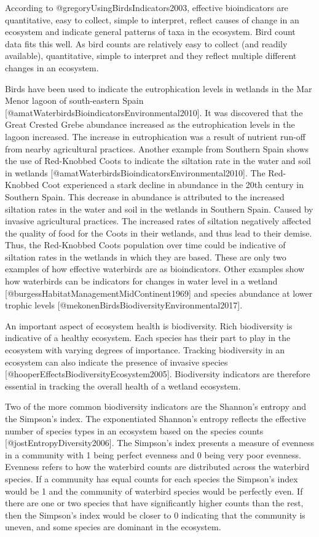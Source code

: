 \documentclass[
]{article}
\begin{document}
According to @gregoryUsingBirdsIndicators2003, effective bioindicators
are quantitative, easy to collect, simple to interpret, reflect causes
of change in an ecosystem and indicate general patterns of taxa in the
ecosystem. Bird count data fits this well. As bird counts are relatively
easy to collect (and readily available), quantitative, simple to
interpret and they reflect multiple different changes in an ecosystem.

Birds have been used to indicate the eutrophication levels in wetlands
in the Mar Menor lagoon of south-eastern Spain
{[}@amatWaterbirdsBioindicatorsEnvironmental2010{]}. It was discovered
that the Great Crested Grebe abundance increased as the eutrophication
levels in the lagoon increased. The increase in eutrophication was a
result of nutrient run-off from nearby agricultural practices. Another
example from Southern Spain shows the use of Red-Knobbed Coots to
indicate the siltation rate in the water and soil in wetlands
{[}@amatWaterbirdsBioindicatorsEnvironmental2010{]}. The Red-Knobbed
Coot experienced a stark decline in abundance in the 20th century in
Southern Spain. This decrease in abundance is attributed to the
increased siltation rates in the water and soil in the wetlands in
Southern Spain. Caused by invasive agricultural practices. The increased
rates of siltation negatively affected the quality of food for the Coots
in their wetlands, and thus lead to their demise. Thus, the Red-Knobbed
Coots population over time could be indicative of siltation rates in the
wetlands in which they are based. These are only two examples of how
effective waterbirds are as bioindicators. Other examples show how
waterbirds can be indicators for changes in water level in a wetland
{[}@burgessHabitatManagementMidContinent1969{]} and species abundance at
lower trophic levels {[}@mekonenBirdsBiodiversityEnvironmental2017{]}.

An important aspect of ecosystem health is biodiversity. Rich
biodiversity is indicative of a healthy ecosystem. Each species has
their part to play in the ecosystem with varying degrees of importance.
Tracking biodiversity in an ecosystem can also indicate the presence of
invasive species {[}@hooperEffectsBiodiversityEcosystem2005{]}.
Biodiversity indicators are therefore essential in tracking the overall
health of a wetland ecosystem.

Two of the more common biodiversity indicators are the Shannon's entropy
and the Simpson's index. The exponentiated Shannon's entropy reflects
the effective number of species types in an ecosystem based on the
species counts {[}@jostEntropyDiversity2006{]}. The Simpson's index
presents a measure of evenness in a community with 1 being perfect
evenness and 0 being very poor evenness. Evenness refers to how the
waterbird counts are distributed across the waterbird species. If a
community has equal counts for each species the Simpson's index would be
1 and the community of waterbird species would be perfectly even. If
there are one or two species that have significantly higher counts than
the rest, then the Simpson's index would be closer to 0 indicating that
the community is uneven, and some species are dominant in the ecosystem.
\end{document}
